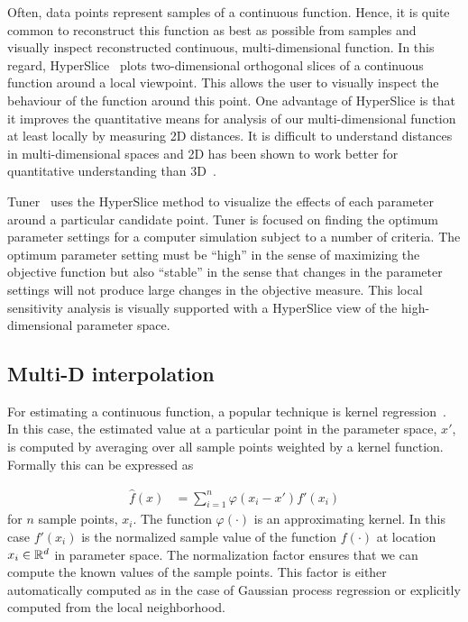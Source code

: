 Often, data points represent samples of a continuous function. Hence, it
is quite common to reconstruct this function as best as possible from samples
and visually inspect reconstructed continuous, multi-dimensional function.
In this regard, HyperSlice~\cite{Wijk:1993} plots
two-dimensional orthogonal slices of a continuous function around a local
viewpoint. This allows the user to visually inspect the behaviour of the
function around this point. One advantage of HyperSlice is that it improves
the quantitative means for analysis of our multi-dimensional function at 
least locally
by measuring 2D distances. It is difficult to understand distances in
multi-dimensional spaces and 2D has been shown to work better for quantitative
understanding than 3D~\cite{Tory:2006}.

Tuner~\cite{Torsney-Weir:2011} uses the HyperSlice method to
visualize the effects of each parameter around a particular candidate point.
Tuner is focused on finding the optimum parameter settings for a computer
simulation subject to a number of criteria. The optimum parameter setting must
be ``high'' in the sense of maximizing the objective function but also
``stable'' in the sense that changes in the parameter settings will not
produce large changes in the objective measure. This local sensitivity
analysis is visually supported with a HyperSlice view of the high-dimensional
parameter space.

\subsection{Multi-D interpolation}
\label{multi-dinterpolation}

For estimating a continuous function, a popular technique is 
kernel regression~\cite{Simonoff:1996}. In this case, the estimated value at a
particular point in the parameter space, $x'$, is computed by averaging over
all sample points weighted by a kernel function. Formally this can be
expressed as

\begin{align}
 \hat{f}(x) &= \sum_{i=1}^n \varphi(x_i -x') f'(x_i)
 \label{eq:kernel_regression}
\end{align}
for $n$ sample points, $x_i$. The function $\varphi(\cdot)$ is an approximating
kernel. In this case $f'(x_i)$ is the normalized sample value 
of the function $f(\cdot)$ at 
location $x_i \in \mathbb{R}^d$
in parameter space. The normalization factor ensures that we can
compute the known values of the sample points.
This factor is either automatically 
computed as in the case of Gaussian process regression or explicitly computed 
from the local neighborhood. 

